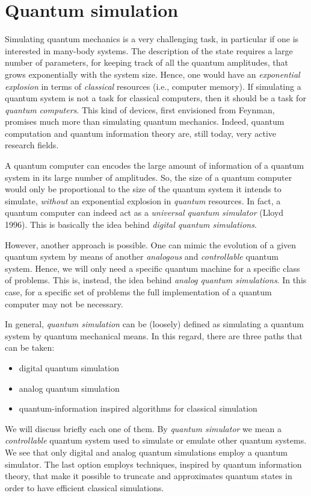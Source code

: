 \section{Quantum simulation}
\label{sec:quantum_simulation}

Simulating quantum mechanics is a very challenging task, in particular if one is interested in many-body systems.
The description of the state requires a large number of parameters, for keeping track of all the quantum amplitudes, that grows exponentially with the system size.
Hence, one would have an \emph{exponential explosion} in terms of \emph{classical} resources (i.e., computer memory).
If simulating a quantum system is not a task for classical computers, then it should be a task for \emph{quantum computers}.
This kind of devices, first envisioned from Feynman\citneeded, promises much more than simulating quantum mechanics.
Indeed, quantum computation and quantum information theory are, still today, very active research fields.

A quantum computer can encodes the large amount of information of a quantum system in its large number of amplitudes.
So, the size of a quantum computer would only be proportional to the size of the quantum system it intends to simulate, \emph{without} an exponential explosion in \emph{quantum} resources.
In fact, a quantum computer can indeed act as a \emph{universal quantum simulator} (Lloyd 1996\citneeded).
This is basically the idea behind \emph{digital quantum simulations}.

However, another approach is possible.
One can mimic the evolution of a given quantum system by means of another \emph{analogous} and \emph{controllable} quantum system.
Hence, we will only need a specific quantum machine for a specific class of problems.
This is, instead, the idea behind \emph{analog quantum simulations}.
In this case, for a specific set of problems the full implementation of a quantum computer may not be necessary.

In general, \emph{quantum simulation} can be (loosely) defined as simulating a quantum system by quantum mechanical means.
In this regard, there are three paths that can be taken:
\begin{itemize}
    \item digital quantum simulation
    \item analog quantum simulation
    \item quantum-information inspired algorithms for classical simulation
\end{itemize}
We will discuss briefly each one of them.
By \emph{quantum simulator} we mean a \emph{controllable} quantum system used to simulate or emulate other quantum systems.
We see that only digital and analog quantum simulations employ a quantum simulator.
The last option employs techniques, inspired by quantum information theory, that make it possible to truncate and approximates quantum states in order to have efficient classical simulations.


